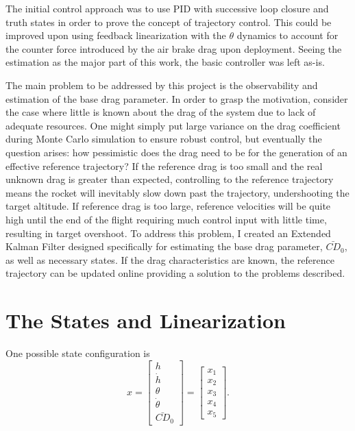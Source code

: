 \documentclass{article}
\begin{document}
  The initial control approach was to use PID with successive loop closure and truth states in order to prove the concept of trajectory control. This could be improved upon using feedback linearization with the $\theta$ dynamics to account for the counter force introduced by the air brake drag upon deployment. Seeing the estimation as the major part of this work, the basic controller was left as-is.

  The main problem to be addressed by this project is the observability and estimation of the base drag parameter. In order to grasp the motivation, consider the case where little is known about the drag of the system due to lack of adequate resources. One might simply put large variance on the drag coefficient during Monte Carlo simulation to ensure robust control, but eventually the question arises: how pessimistic does the drag need to be for the generation of an effective reference trajectory? If the reference drag is too small and the real unknown drag is greater than expected, controlling to the reference trajectory means the rocket will inevitably slow down past the trajectory, undershooting the target altitude. If reference drag is too large, reference velocities will be quite high until the end of the flight requiring much control input with little time, resulting in target overshoot. To address this problem, I created an Extended Kalman Filter designed specifically for estimating the base drag parameter, $\bar{CD}_0$, as well as necessary states. If the drag characteristics are known, the reference trajectory can be updated online providing a solution to the problems described.

\section{The States and Linearization}
  One possible state configuration is
  \begin{equation}
    x = \left[\begin{matrix} h \\
                             \dot{h} \\
                             \theta \\
                             \dot{\theta} \\
                             \bar{CD}_0         \end{matrix}\right]
      = \left[\begin{matrix} x_1 \\
                             x_2 \\
                             x_3 \\
                             x_4 \\
                             x_5         \end{matrix}\right].
  \end{equation}
\end{document}
